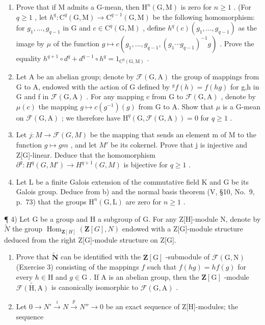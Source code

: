 \begin{enumerate}
\def\labelenumi{\alph{enumi})}
\item
  Prove that if M admits a G-mean, then \(\mathrm{H}^{n}(\mathrm{G},\mathrm{M})\) is zero for \(n \geqslant 1\) . (For \(q \geqslant 1\) , let \(h^{q}: \mathrm{C}^{q}(\mathrm{G},\mathrm{M}) \to \mathrm{C}^{q-1}(\mathrm{G},\mathrm{M})\) be the following homomorphism: for \(g_{1}, \ldots, g_{q-1}\) in G and \(c \in \mathrm{C}^{q}(\mathrm{G}, \mathrm{M})\) , define \(h^{q}(c)(g_{1}, \ldots, g_{q-1})\) as the image by \(\mu\) of the function \(g \mapsto c(g_{1}, \ldots, g_{q-1}, (g_{1} \cdots g_{q-1})^{-1}g)\) . Prove the equality \(h^{q+1} \circ d^{q} + d^{q-1} \circ h^{q} = 1_{\mathrm{C}^{q}(\mathrm{G}, \mathrm{M})}\) .
\item
  Let A be an abelian group; denote by \(\mathcal{F}(\mathrm{G},\mathrm{A})\) the group of mappings from G to A, endowed with the action of G defined by \({}^{g}f(h)=f(hg)\) for g,h in G and f in \(\mathcal{F}(\mathrm{G},\mathrm{A})\) . For any mapping c from G to \(\mathcal{F}(\mathrm{G},\mathrm{A})\) , denote by \(\mu(c)\) the mapping \(g\mapsto c(g^{-1})(g)\) from G to A. Show that \(\mu\) is a G-mean on \(\mathcal{F}(\mathrm{G},\mathrm{A})\) ; we therefore have \(\mathrm{H}^{q}(\mathrm{G},\mathcal{F}(\mathrm{G},\mathrm{A}))=0\) for \(q\geqslant1\) .
\item
  Let \(j: M \to \mathcal{F}(G, M)\) be the mapping that sends an element m of M to the function \(g \mapsto gm\) , and let \(M'\) be its cokernel. Prove that j is injective and Z{[}G{]}-linear. Deduce that the homomorphism \(\partial^{q}: H^{q}(G, M') \to H^{q+1}(G, M)\) is bijective for \(q \geqslant 1\) .
\item
  Let L be a finite Galois extension of the commutative field K and G be its Galois group. Deduce from b) and the normal basis theorem (V, §10, No.~9, p.~73) that the groups \(\mathrm{H}^{n}(\mathrm{G},\mathrm{L})\) are zero for \(n \geqslant 1\) .
\end{enumerate}

¶ 4) Let G be a group and H a subgroup of G. For any Z{[}H{]}-module N, denote by \(\widetilde{N}\) the group \(\operatorname{Hom}_{\mathbf{Z}[H]}(\mathbf{Z}[G], N)\) endowed with a Z{[}G{]}-module structure deduced from the right Z{[}G{]}-module structure on Z{[}G{]}.

\begin{enumerate}
\def\labelenumi{\alph{enumi})}
\item
  Prove that \(\widetilde{\mathbf{N}}\) can be identified with the \(\mathbf{Z}[\mathrm{G}]\) -submodule of \(\mathcal{F}(\mathrm{G},\mathrm{N})\) (Exercise 3) consisting of the mappings \(f\) such that \(f(hg) = hf(g)\) for every \(h\in \mathrm{H}\) and \(g\in \mathrm{G}\) . If \(\mathrm{A}\) is an abelian group, then the \(\mathbf{Z}[\mathrm{G}]\) -module \(\widetilde{\mathcal{F}(\mathrm{H},\mathrm{A})}\) is canonically isomorphic to \(\mathcal{F}(\mathrm{G},\mathrm{A})\) .
\item
  Let \(0 \rightarrow N' \stackrel{i}{\rightarrow} N \stackrel{p}{\rightarrow} N'' \rightarrow 0\) be an exact sequence of Z{[}H{]}-modules; the sequence
\end{enumerate}


